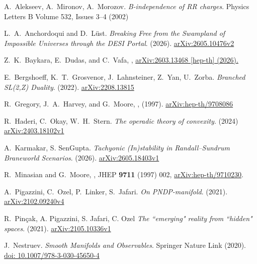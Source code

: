 \documentclass{article}
\numberwithin{tm}{section}
\numberwithin{dn}{section}
\numberwithin{as}{section}
\numberwithin{rk}{section}
\numberwithin{lem}{section}
\numberwithin{ax}{section}
\numberwithin{pp}{section}
\numberwithin{eg}{section}
\numberwithin{war}{section}
\numberwithin{equation}{section}
\numberwithin{prop}{section}
\numberwithin{nt}{section}
\numberwithin{rc}{section}
\numberwithin{setup}{section}
\begin{document}
	
	\begin{thebibliography}{9}
		
		A.~Alekseev, A.~Mironov, A.~Morozov. \emph{B-independence of RR charges}. Physics Letters B Volume 532, Issues 3–4 (2002)
		
		L.~A.~Anchordoqui and D.~Lüst. \emph{Breaking Free from the Swampland of Impossible Universes through the DESI Portal}. (2026). \href{https://arxiv.org/html/2605.10476v2}{arXiv:2605.10476v2}
		
		Z.~K.~Baykara, E.~Dudas, and C.~Vafa,
		,
		\newblock \href{https://arxiv.org/pdf/2603.13468}{arXiv:2603.13468 [hep-th] (2026).}
		
		E.~Bergshoeff, K.~T.~Grosvenor, J.~Lahnsteiner, Z.~Yan, U.~Zorba. \emph{Branched SL(2,Z) Duality}. (2022). \href{https://arxiv.org/abs/2208.13815}{arXiv:2208.13815}
		
		R.~Gregory, J.~A.~Harvey, and G.~Moore,
		, (1997).
		\newblock \href{https://arxiv.org/abs/hep-th/9708086}{arXiv:hep-th/9708086 }
		
		 R.~Haderi, C.~Okay, W.~H.~Stern. \emph{The operadic theory of convexity}. (2024) \href{https://arxiv.org/abs/2403.18102v1}{arXiv:2403.18102v1}
		
		 A.~Karmakar, S. SenGupta. \emph{Tachyonic (In)stability in Randall--Sundrum Braneworld Scenarios}. (2026). \href{https://arxiv.org/abs/2605.18403v1}{ arXiv:2605.18403v1}
		
		R.~Minasian and G.~Moore,
		,
		\newblock JHEP {\bf 9711} (1997) 002,
		\newblock \href{https://arxiv.org/abs/hep-th/9710230}{arXiv:hep-th/9710230}.
		
		A.~Pigazzini, C.~Ozel, P.~Linker, S.~Jafari. \emph{On PNDP-manifold}. (2021). \href{https://arxiv.org/abs/2102.09240}{arXiv:2102.09240v4}
		
		R.~Pinçak, A. Pigazzini, S. Jafari, C. Ozel \emph{The ``emerging" reality from ``hidden" spaces}. (2021). \href{https://arxiv.org/abs/2105.10336}{ arXiv:2105.10336v1}
		
		 J.~Nestruev. \emph{Smooth Manifolds and Observables}. Springer Nature Link (2020). \href{https://link.springer.com/book/10.1007/978-3-030-45650-4}{doi: 10.1007/978-3-030-45650-4}
		

\end{thebibliography}
\end{document}
